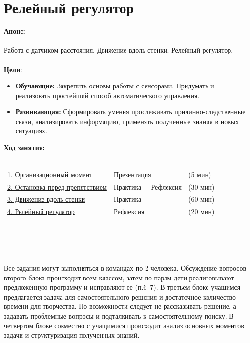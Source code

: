 \chapter{Релейный регулятор}
{\bfseries Анонс:}\\\\
Работа с датчиком расстояния. Движение вдоль стенки. Релейный регулятор.\\\\
{\bfseries Цели:}
\begin{itemize}
	\item{}{\bfseries Обучающие:} Закрепить основы работы с сенсорами. Придумать и реализовать простейший способ автоматического управления.
	\item{}{\bfseries Развивающая:} Сформировать умения прослеживать причинно-следственные связи, анализировать информацию, применять полученные знания в новых ситуациях.\\
\end{itemize}	
{\bfseries Ход занятия:}\\\\
\begin{tabular}[h!]{lll}
	{\hyperlink{lesson15x1}{1. Организационный момент}}&{Презентация}&{(5 мин)}\\
	{\hyperlink{lesson15x2}{2. Остановка перед препятствием}}&{Практика + Рефлексия}&{(30 мин)}\\
	{\hyperlink{lesson15x3}{3. Движение вдоль стенки}}&{Практика}&{(60 мин)}\\
	{\hyperlink{lesson15x4}{4. Релейный регулятор}}&{Рефлексия}&{(20 мин)}\\
\end{tabular}\\\\

{\hypertarget{lesson15x1}{}}\\\\	

Все задания могут выполняться в командах по 2 человека. Обсуждение вопросов второго блока происходит всем классом, затем по парам дети реализовывают предложенную программу и исправляют ее (п.6--7). В третьем блоке учащимся предлагается задача для самостоятельного решения и достаточное количество времени для творчества. По возможности следует не рассказывать решение, а задавать проблемные вопросы и подталкивать к самостоятельному поиску. В четвертом блоке совместно с учащимися происходит анализ основных моментов задачи и структуризация полученных знаний.\\\\

